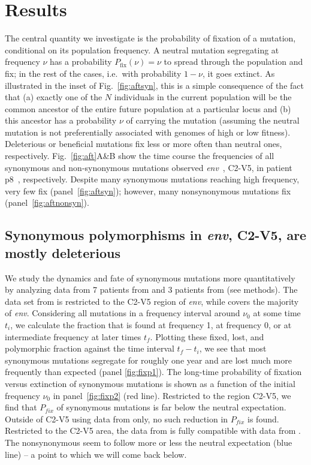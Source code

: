 \documentclass[rmp, twocolumn]{revtex4}
\newcommand{\pfix}{P_{fix}}
\newcommand{\FIG}[1]{Fig.~\ref{fig:#1}}
\newcommand{\env}{\textit{env}}
\begin{document}
\section{Results}

The central quantity we investigate is the probability of fixation of a
mutation, conditional on its population frequency.  A neutral mutation
segregating at frequency $\nu$ has a probability $P_\text{fix}(\nu) = \nu$ to
spread through the population and fix; in the rest of the cases, i.e.~with
probability $1-\nu$, it goes extinct. As illustrated in the inset of \FIG{aftsyn},
this is a simple consequence of the fact that
(a) exactly one of the $N$ individuals in the current population will be
the common ancestor of the entire future population at a particular locus and
(b) this ancestor has a probability $\nu$ of carrying the mutation (assuming
the neutral mutation is not preferentially associated with genomes of high or
low fitness).
Deleterious or beneficial mutations fix less or
more often than neutral ones, respectively. \FIG{aft}A\&B show 
the time course the frequencies of all synonymous and non-synonymous mutations
observed \env~, C2-V5, in patient p8~\citep{shankarappa_consistent_1999},
respectively. Despite many synonymous mutations reaching high frequency, very
few fix (panel~\ref{fig:aftsyn}); however, many nonsynonymous mutations fix
(panel~\ref{fig:aftnonsyn}).

\subsection{Synonymous polymorphisms in \env, C2-V5, are mostly deleterious}
We study the dynamics and fate of synonymous mutations more quantitatively by
analyzing data from 7 patients from
\citet{shankarappa_consistent_1999,liu_selection_2006} and 3 patients from
\citet{bunnik_autologous_2008} (see methods). The data set from
\citet{shankarappa_consistent_1999,liu_selection_2006} is restricted to the
C2-V5 region of \env, while \citet{bunnik_autologous_2008} covers the
majority of \env. Considering all mutations in a
frequency interval around $\nu_0$ at some time $t_i$, we calculate the fraction
that is found at frequency 1, at frequency 0, or at intermediate frequency at
later times $t_f$. Plotting these fixed, lost, and polymorphic fraction against
the time interval $t_f-t_i$, we see that most synonymous mutations segregate for
roughly one year and are lost much more frequently than expected (panel
\ref{fig:fixp1}). The long-time probability of fixation versus extinction of
synonymous mutations is shown as a function of the initial frequency $\nu_0$ in
panel~\ref{fig:fixp2} (red line). Restricted to the region C2-V5, we find that
$\pfix$ of synonymous mutations is far below the neutral expectation.
Outside of C2-V5 using data from \citet{bunnik_autologous_2008} only, no such
reduction in $\pfix$ is found. Restricted to the C2-V5 area, the data from
\citet{bunnik_autologous_2008} is fully compatible with data from
\citet{shankarappa_consistent_1999}. The nonsynonymous seem to follow more or
less the neutral expectation (blue line) -- a point to which we will come back below.
\end{document}
